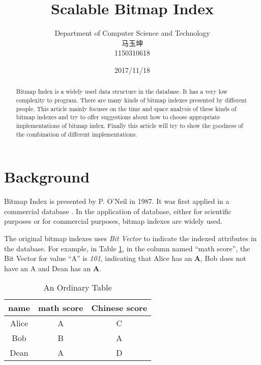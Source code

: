 \documentclass[12pt, a4paper]{article}
\begin{document}
\title{{\bf\Huge Scalable Bitmap Index}}
\author{Department of Computer Science and Technology\\马玉坤\\1150310618}
\date{2017/11/18}
\maketitle
\thispagestyle{empty}
\newpage

\begin{abstract}
  Bitmap Index is a widely used data structure in the database. It has a very low complexity to program. There are many kinds of bitmap indexes presented by different people. This article mainly focuses on the time and space analysis of these kinds of bitmap indexes and try to offer suggestions about how to choose appropriate implementations of bitmap index. Finally this article will try to show the goodness of the combination of different implementations.
\end{abstract}

\section{Background}

Bitmap Index is presented by P. O'Neil in 1987. It was first applied in a commercial database \citep{spiegler1985storage}. In the application of database, either for scientific purposes or for commercial purposes, bitmap indexes are widely used.

The original bitmap indexes uses {\emph{Bit Vector}} to indicate the indexed attributes in the database. For example, in Table \ref{table:ordinary-table}, in the column named ``math score'', the Bit Vector for value ``A'' is {\emph{101}}, indicating that Alice has an \textbf{A}, Bob does not have an A and Dean has an \textbf{A}.

\begin{table}[H]
\centering
\caption{An Ordinary Table}
\label{table:ordinary-table}
\begin{tabular}{ccc}
\toprule
name  & math score & Chinese score \\
\midrule
Alice & A          & C             \\
Bob   & B          & A             \\
Dean  & A          & D             \\
\bottomrule
\end{tabular}
\end{table}
\end{document}
